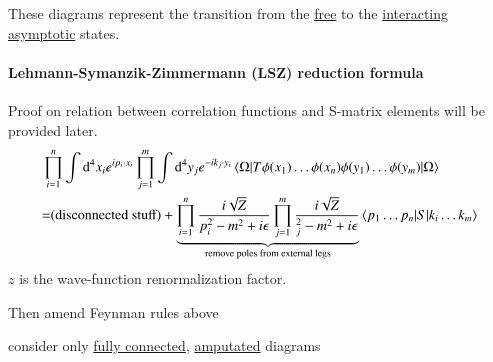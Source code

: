 These diagrams represent the transition from the \underline{free} to the \underline{interacting asymptotic} states.

\paragraph{Lehmann-Symanzik-Zimmermann (LSZ) reduction formula} Proof on relation between correlation functions and S-matrix elements will be provided later.
\begin{align}
	\begin{split}
	&\prod_{i=1}^n \int \dd^4 x_i e^{ip_i \cdot x_i} \prod_{j=1}^{m} \int\dd^4 y_j e^{-i k_j \cdot y_i} \braket{\Omega | T\phi(x_1)\dots\phi(x_n)\phi(y_1)\dots\phi(y_m)|\Omega} \\
	&{=} (\text{disconnected stuff}) + \underbrace{\prod_{i=1}^n \frac{i\sqrt{Z}}{p_i^2 - m^2 +i\epsilon} \prod_{j=1}^m \frac{i\sqrt{Z}}{  _j^2 - m^2 + i\epsilon}}_{\text{remove poles from external legs}} \braket{p_1\dots p_n| S | k_i\dots k_m}
	\end{split}
\end{align}
$z$ is the wave-function renormalization factor.

Then amend Feynman rules above
\begin{center}
	consider only \underline{fully connected}, \underline{amputated} diagrams
\end{center}

